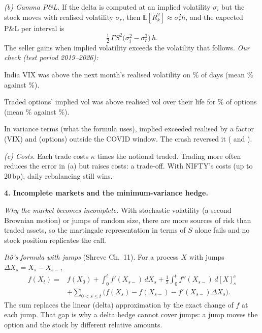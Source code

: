 \documentclass[10pt,leqno]{amsart}
\newcommand{\heading}[1]{\medskip\noindent\textbf{#1}\par}
\begin{document}
\noindent\emph{(b) Gamma P\&L.} If the delta is computed at an implied
volatility $\sigma_i$ but the stock moves with realised volatility $\sigma_r$,
then $\mathbb{E}[R_k^2]\approx\sigma_r^2h$, and the expected P\&L per interval is
\[
\tfrac12\,\Gamma S^2\big(\sigma_i^2-\sigma_r^2\big)\,h .
\]
The seller gains when implied volatility exceeds the volatility that follows.
\emph{Our check (test period 2019--2026):}
\begin{compactitem}
\item India VIX was above the next month's realised volatility on \IvrVixAbove\%
of days (mean \IvrVixMean\% against \IvrVixRvMean\%).
\item Traded options' implied vol was above realised vol over their life for
\IvrOptAbove\% of options (mean \IvrOptIvMean\% against \IvrOptRvMean\%).
\item In variance terms (what the formula uses), implied exceeded realised by a
factor \IvrVixVarRatioEx{} (VIX) and \IvrOptVarRatioEx{} (options) outside the
COVID window. The crash reversed it (\IvrVixVarRatioCovid{} and
\IvrOptVarRatioCovid).
\end{compactitem}

\noindent\emph{(c) Costs.} Each trade costs $\kappa$ times the notional traded.
Trading more often reduces the error in (a) but raises costs: a trade-off. With
NIFTY's costs (up to 20\,bp), daily rebalancing still wins.

\heading{4. Incomplete markets and the minimum-variance hedge.}
\noindent\emph{Why the market becomes incomplete.} With stochastic volatility
(a second Brownian motion) or jumps of random size, there are more sources of
risk than traded assets, so the martingale representation in terms of $S$
alone fails and no stock position replicates the call.

\noindent\emph{It\^o's formula with jumps} (Shreve Ch.~11). For a process $X$
with jumps $\Delta X_s=X_s-X_{s-}$,
\begin{align*}
f(X_t)={}&f(X_0)+\int_0^t f'(X_{s-})\,dX_s+\frac12\int_0^t f''(X_{s-})\,d[X]^c_s\\
&+\sum_{0<s\le t}\big(f(X_s)-f(X_{s-})-f'(X_{s-})\Delta X_s\big).
\end{align*}
The sum replaces the linear (delta) approximation by the exact change of $f$ at
each jump. That gap is why a delta hedge cannot cover jumps: a jump moves the
option and the stock by different relative amounts.
\end{document}
